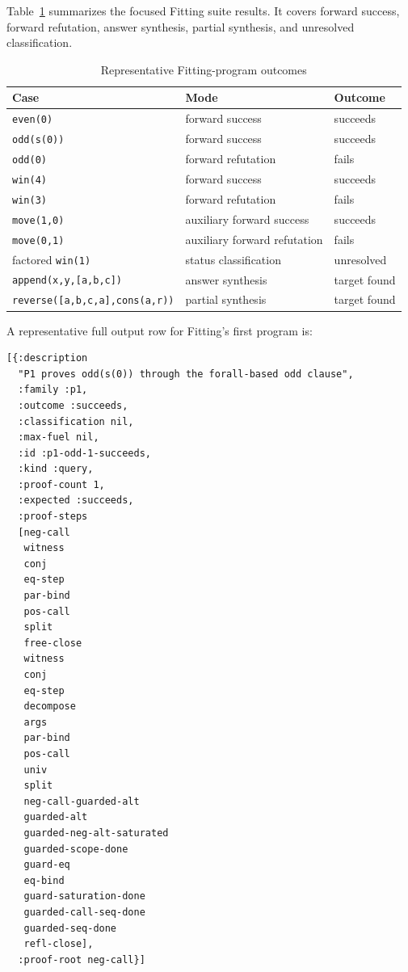 \documentclass[acmsmall,screen,review,anonymous]{acmart}
\begin{document}
Table~\ref{tab:fitting-results} summarizes the focused Fitting suite results.
It covers forward success, forward refutation, answer synthesis, partial
synthesis, and unresolved classification.

\begin{table}[h]
  \caption{Representative Fitting-program outcomes}
  \label{tab:fitting-results}
  \begin{tabular}{lll}
    \toprule
    Case & Mode & Outcome \\
    \midrule
    \texttt{even(0)} & forward success & succeeds \\
    \texttt{odd(s(0))} & forward success & succeeds \\
    \texttt{odd(0)} & forward refutation & fails \\
    \texttt{win(4)} & forward success & succeeds \\
    \texttt{win(3)} & forward refutation & fails \\
    \texttt{move(1,0)} & auxiliary forward success & succeeds \\
    \texttt{move(0,1)} & auxiliary forward refutation & fails \\
    factored \texttt{win(1)} & status classification & unresolved \\
    \texttt{append(x,y,[a,b,c])} & answer synthesis & target found \\
    \texttt{reverse([a,b,c,a],cons(a,r))} & partial synthesis & target found \\
    \bottomrule
  \end{tabular}
\end{table}

A representative full output row for Fitting's first program is:

\begin{verbatim}
[{:description
  "P1 proves odd(s(0)) through the forall-based odd clause",
  :family :p1,
  :outcome :succeeds,
  :classification nil,
  :max-fuel nil,
  :id :p1-odd-1-succeeds,
  :kind :query,
  :proof-count 1,
  :expected :succeeds,
  :proof-steps
  [neg-call
   witness
   conj
   eq-step
   par-bind
   pos-call
   split
   free-close
   witness
   conj
   eq-step
   decompose
   args
   par-bind
   pos-call
   univ
   split
   neg-call-guarded-alt
   guarded-alt
   guarded-neg-alt-saturated
   guarded-scope-done
   guard-eq
   eq-bind
   guard-saturation-done
   guarded-call-seq-done
   guarded-seq-done
   refl-close],
  :proof-root neg-call}]
\end{verbatim}
\end{document}
